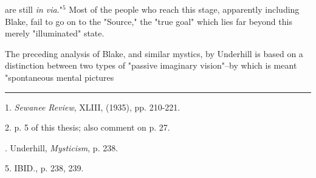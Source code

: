 are still \textit{in via}."$^{5}$ Most of the people who reach this stage, apparently
including Blake, fail to go on to the "Source,"
the "true goal" which lies far beyond this merely "illuminated" state.\par
\vspace*{0.5\baselineskip}
The preceding analysis of Blake, and similar mystics, by
Underhill is based on a distinction between two types of
"passive imaginary vision"--by which is meant "spontaneous mental
pictures\linebreak
\null\par
\vspace*{-\baselineskip}
\vspace*{\fill}
\noindent\rule{0.25\textwidth}{0.4pt}\par
1. \textit{Sewanee Review}, XLIII, (1935), pp. 210-221.\par
2. p. 5 of this thesis; also comment on p. 27.\par
[3, 4]. Underhill, \textit{Mysticism}, p. 238.\par
5. IBID., p. 238, 239.\par

\newpage

